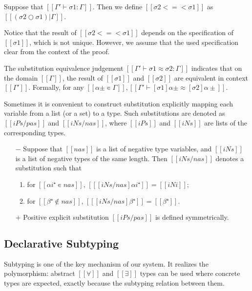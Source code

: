 \documentclass[acmsmall,natbib=false,review,anonymous]{acmart}
\begin{document}
\begin{definition}
  Suppose that $[[Γ' ⊢ σ1 : Γ]]$.
  Then we define $[[σ2 <=< σ1]]$ as $[[(σ2 ○ σ1)|Γ]]$.
\end{definition}
Notice that the result of $[[σ2 <=< σ1]]$ depends on the 
specification of $[[σ1]]$, which is not unique. 
However, we assume that the used specification clear from the 
context of the proof. 

\begin{definition}
  The substitution equivalence judgement $[[Γ' ⊢ σ1 ≈ σ2 : Γ]]$ 
  indicates that on the domain $[[Γ]]$, 
  the result of $[[σ1]]$ and $[[σ2]]$ are equivalent in context $[[Γ']]$.
  Formally, for any $[[α± ∊ Γ]], [[ Γ' ⊢ [σ1]α± ≈ [σ2]α± ]]$.
\end{definition}

Sometimes it is convenient to construct substitution 
explicitly mapping each variable from a list (or a set)
to a type. Such substitutions are denoted as $[[iPs / pas]]$
and $[[iNs / nas]]$, where $[[iPs]]$ and $[[iNs]]$ are lists of 
the corresponding types.
\begin{definition}
  \hfill
  \begin{itemize}
    \item [$-$]
      Suppose that $[[nas]]$ is a list of negative type variables,
      and $[[iNs]]$ is a list of negative types of the same length.
      Then $[[iNs / nas]]$ denotes a substitution such that 
      \begin{enumerate}
        \item for $[[αi⁺ ∊ {nas}]]$, $[[ [iNs / nas] αi⁺]] = [[iNi]]$;
        \item for $[[β⁺ ∉ {nas}]]$, $[[ [iNs / nas] β⁺]] = [[β⁺]]$.
      \end{enumerate}
    \item [$+$]
      Positive explicit substitution $[[iPs / pas]]$
      is defined symmetrically.
  \end{itemize}
\end{definition}


\subsection{Declarative Subtyping}
Subtyping is one of the key mechanism of our system. 
It realizes the polymorphism: abstract $[[∀]]$ and 
$[[∃]]$ types can be used where concrete types are expected,
exactly because the subtyping relation between them.
\end{document}
